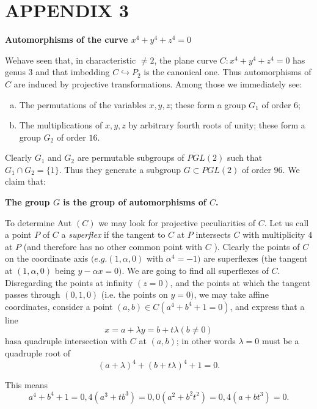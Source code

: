 \chapter*{APPENDIX 3}


\begin{center}
  \textbf{\Large Automorphisms of the curve  $x^4 + y^4 + z^4=0$ }
\end{center}

We\pageoriginale have seen that, in characteristic $\neq 2$, the plane curve $C:x^4
+ y^4 +z^4 = 0$ has genus $3$ and that imbedding $ C \hookrightarrow
{P}_2$ is the canonical one. Thus automorphisms  of $C$ are induced by
projective transformations. Among those we immediately see: 
\begin{enumerate}[a)]
\item The permutations of the variables $x,y,z$; these form a group
  $G_1$ of order 6; 
\item The multiplications of $x,y,z$ by arbitrary fourth roots of
  unity; these form a group $ G_2$ of order $16$. 
\end{enumerate}

Clearly $G_1$ and $G_2$ are permutable subgroups of $PGL(2)$ such that
$ G_1 \cap G_2 = \{ 1 \}$. Thus they generate a subgroup $ G \subset
PGL(2) $ of order $96$. We claim that: 

\medskip
\noindent
\textbf{The group $G$ is the group of automorphisms of $C$.}

To determine  Aut $(C)$ we may look for projective peculiarities of
$C$. Let us call a point $P$ of $C$ a \textit {superflex} if the
tangent to $C$ at $P$ intersects $C$ with multiplicity $4$ at $P$ (and
therefore has no other common point with $C$ ). Clearly the points of
$C$ on the coordinate axis $(e.g. (1,\alpha  ,0)$  with $\alpha^4 =
-1)$ are superflexes (the tangent at $(1, \alpha , 0)$ being $y-\alpha
x=0)$. We are going to find all superflexes of $C$. Disregarding the
points at infinity $(z = 0)$, and the points at which the tangent
passes through $(0,1,0)$ (i.e. the points on $y = 0)$, we may take
affine coordinates, consider a point $(a,b) \in C(a^4 + b^4 + 1 = 0)$,
and express that a line  
$$
x=a + \lambda y= b+t\lambda(b \neq 0)
$$
has\pageoriginale a quadruple intersection with $C$ at $(a,b)$; in other words
$\lambda = 0 $ must be a quadruple root of  
$$
(a+\lambda)^4 +(b+t\lambda)^4 +1 = 0. 
$$

This means
\setcounter{equation}{0}
\begin{equation*}
  a^4 + b^4 + 1 = 0, 4(a^3+tb^3) =0 , 0(a^2+b^2t^2) = 0 ,4(a+bt^3) = 0.
\end{equation*}

